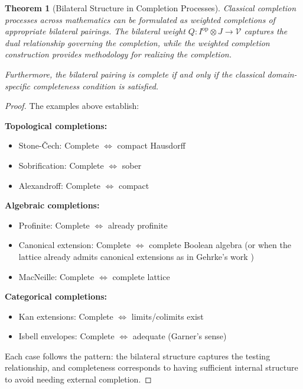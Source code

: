 \documentclass[11pt]{article}
\theoremstyle{plain}
\newtheorem{theorem}{Theorem}[section]
\theoremstyle{definition}
\theoremstyle{remark}
\newcommand{\V}{\mathcal{V}}
\newcommand{\op}{\mathrm{op}}
\begin{document}
\begin{theorem}[Bilateral Structure in Completion Processes]\label{thm:bilateral-examples-summary}
Classical completion processes across mathematics can be formulated as weighted completions of appropriate bilateral pairings. The bilateral weight $Q : I^{\op} \otimes J \to \V$ captures the dual relationship governing the completion, while the weighted completion construction provides methodology for realizing the completion.

Furthermore, the bilateral pairing is complete if and only if the classical domain-specific completeness condition is satisfied.
\end{theorem}

\begin{proof}
The examples above establish:

\textbf{Topological completions:}
\begin{itemize}
\item Stone-\v{C}ech: Complete $\Leftrightarrow$ compact Hausdorff
\item Sobrification: Complete $\Leftrightarrow$ sober
\item Alexandroff: Complete $\Leftrightarrow$ compact
\end{itemize}

\textbf{Algebraic completions:}
\begin{itemize}
\item Profinite: Complete $\Leftrightarrow$ already profinite  
\item Canonical extension: Complete $\Leftrightarrow$ complete Boolean algebra (or when the lattice already admits canonical extensions as in Gehrke's work \cite{gehrke2001bounded})
\item MacNeille: Complete $\Leftrightarrow$ complete lattice \cite{macneille1937extension}
\end{itemize}

\textbf{Categorical completions:}
\begin{itemize}
\item Kan extensions: Complete $\Leftrightarrow$ limits/colimits exist
\item Isbell envelopes: Complete $\Leftrightarrow$ adequate (Garner's sense) \cite{garner2018isbell}
\end{itemize}

Each case follows the pattern: the bilateral structure captures the testing relationship, and completeness corresponds to having sufficient internal structure to avoid needing external completion.
\end{proof}
\end{document}
